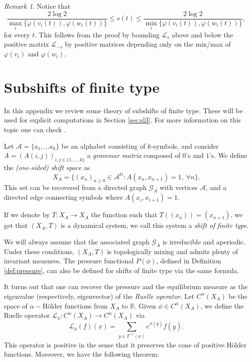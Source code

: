 \documentclass{amsart}
\newcommand{\RR}{\mathbb{R}}
\theoremstyle{remark}
\newtheorem{rmk}[thm]{Remark}
\theoremstyle{definition}
\begin{document}
\begin{rmk}
 Notice that 
   $$\frac{2 \log 2}{\max_i \{ \varphi (v_i (t)),\varphi (w_i (t)) \}} \leq s(t) \leq \frac{2 \log 2}{\min_i \{ \varphi (v_i (t)),\varphi (w_i (t)) \}},$$
 for every $t$.
 This follows from the proof by bounding $\mathcal{L}_s$ above and below the positive matrix $\mathcal{L}_{-s}$ by positive matrices depending only on the min/max of $\varphi (v_i)$ and $\varphi (w_i)$.
\end{rmk}



\appendix
\section{Subshifts of finite type} 
\label{app:subshifts}
In this appendix we review some theory of subshifts of finite type. These will be used for explicit computations in Section \ref{sec:sl3}. For more information on this topic one can check \cite{parry1990zeta}.

Let $\mathcal{A} = \{a_1, \ldots a_k\}$ be an alphabet consisting of $k$-symbols, and consider $A = (A(i,j))_{i,j \in \{1,\ldots, k\}}$ a \emph{grammar matrix} composed of $0$'s and $1$'s.
We define the \emph{(one-sided) shift space} as
$$X_A = \{(x_n)_{n\geq 0} \in \mathcal{A}^\mathbb{N} : A(x_n,x_{n+1}) =1,\: \forall n \}.$$
This set can be recovered from a directed graph $\mathcal{G}_A$ with vertices $\mathcal{A}$, and a directed edge connecting symbols where $A (x_i,x_{i+1}) = 1$.

If we denote by $T: X_A \to X_A$ the function such that $T((x_n)) = (x_{n+1})$, we get that $(X_A, T)$ is a dynamical system, we call this system a \emph{shift of finite type}.

We will always assume that the associated graph $\mathcal{G}_A$ is irreducible and aperiodic.
Under these conditions, $(X_A, T)$ is topologically mixing and admits plenty of invariant measures. The pressure functional $P(\phi)$, defined in Definition \ref{def:pressure}, 
can also be defined for shifts of finite type via the same formula.


It turns out that one can recover the pressure and the equilibrium measure as the eigenvalue (respectively, eigenvector) of the \emph{Ruelle operator}.
Let $C^\alpha (X_A)$ be the space of $\alpha-$H\"older functions from $X_A$ to $\RR$. Given $\phi \in C^\alpha (X_A)$, we define the Ruelle operator $\mathcal{L}_\phi : C^\alpha (X_A) \rightarrow C^\alpha (X_A)$ via
$$\mathcal{L}_\phi (f) (\underline{x}) = \sum_{\underline{y}\in T^{-1}(\underline{x})} e^{\phi (\underline{y})} f(\underline{y}).$$
This operator is positive in the sense that it preserves the cone of positive H\"older functions.
Moreover, we have the following theorem:
\end{document}
